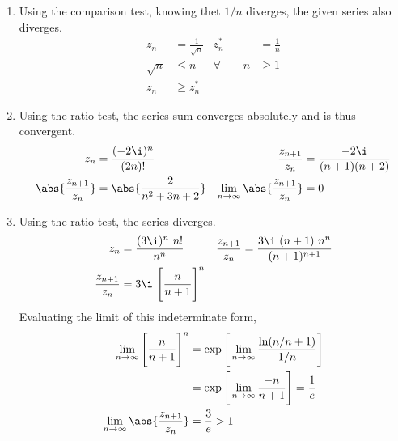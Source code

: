 \begin{enumerate}
    \item Using the comparison test, knowing thet $ 1/n $ diverges, the given series also
          \textcolor{y_p}{diverges}.
          \begin{align}
              z_n              & = \frac{1}{\sqrt{n}} &
              z_n^*            & = \frac{1}{n}          \\
              \sqrt{n}         & \leq n               &
              \forall \qquad n & \geq 1                 \\
              z_n              & \geq  z_n^*
          \end{align}

    \item Using the ratio test, the series sum converges absolutely and is thus
          \textcolor{y_h}{convergent}.
          \begin{align}
              z_n                       & = \frac{(-2\i)^n}{(2n)!}        &
              \frac{z_{n+1}}{z_n}       & = \frac{-2\i}{(n+1)(n+2)}         \\
              \abs{\frac{z_{n+1}}{z_n}} & = \abs{\frac{2}{n^2 + 3n + 2 }} &
              \lim_{n \to \infty}
              \abs{\frac{z_{n+1}}{z_n}} & = 0
          \end{align}

    \item Using the ratio test, the series \textcolor{y_p}{diverges}.
          \begin{align}
              z_n                 & = \frac{(3\i)^n\ n!}{n^n}             &
              \frac{z_{n+1}}{z_n} & = \frac{3\i\ (n+1)\ n^n}{(n+1)^{n+1}}   \\
              \frac{z_{n+1}}{z_n} & = 3\i\ \Bigg[\frac{n}{n+1}\Bigg]^n
          \end{align}
          Evaluating the limit of this indeterminate form,
          \begin{align}
              \lim_{n \to \infty}
              \Bigg[\frac{n}{n+1}\Bigg]^n & = \exp\Bigg[\lim_{n \to \infty}
              \frac{\ln(n/n+1)}{1/n}\Bigg]                                  \\
                                          & = \exp\Bigg[\lim_{n \to \infty}
              \frac{-n}{n + 1}\Bigg] = \frac{1}{e}                          \\
              \lim_{n \to \infty}
              \abs{\frac{z_{n+1}}{z_n}}   & = \frac{3}{e} > 1
          \end{align}


\end{enumerate}
